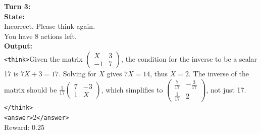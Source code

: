 \begin{tcolorbox}[breakable, colback=gray!2, colframe=black, boxrule=0.5pt, arc=2pt, width=\linewidth, title=Box 7: Model rollout after multi-turn RL training with UFO (Failure Case)]
\vspace{4pt}
\textbf{Turn 3:} \\
\textbf{State:} \\
Incorrect. Please think again. \\
You have 8 actions left. \\
\textbf{Output:} \\
\texttt{<think>}Given the matrix \(\begin{pmatrix} X & 3 \\ -1 & 7 \end{pmatrix}\), the condition for the inverse to be a scalar 17 is \(7X + 3 = 17\). Solving for \(X\) gives \(7X = 14\), thus \(X = 2\). The inverse of the matrix should be \(\frac{1}{17}\begin{pmatrix} 7 & -3 \\ 1 & X \end{pmatrix}\), which simplifies to \(\begin{pmatrix} \frac{7}{17} & -\frac{3}{17} \\ \frac{1}{17} & 2 \end{pmatrix}\), not just 17.\texttt{</think>} \\
\texttt{<answer>}2\texttt{</answer>} \\
Reward: 0.25
\end{tcolorbox}

